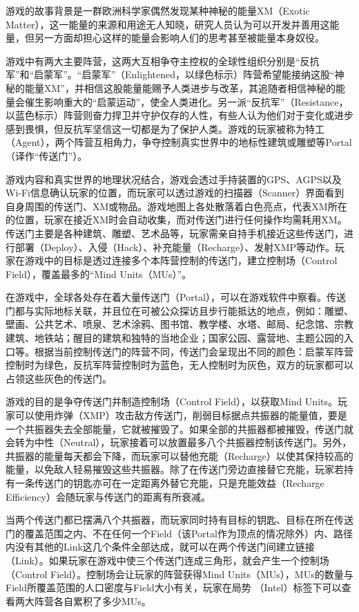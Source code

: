 \documentclass[UTF8]{ctexart}
\begin{document}
\begin{tcolorbox}[breakable]
    游戏的故事背景是一群欧洲科学家偶然发现某种神秘的能量XM（Exotic Matter），这一能量的来源和用途无人知晓，研究人员认为可以开发并善用这能量，但另一方面却担心这样的能量会影响人们的思考甚至被能量本身奴役。

    游戏中有两大主要阵营，这两大互相争夺主控权的全球性组织分别是“反抗军”和“启蒙军”。“启蒙军”（Enlightened，以绿色标示）阵营希望能接纳这股“神秘的能量XM”，并相信这股能量能赐予人类进步与改革，其追随者相信神秘的能量会催生影响重大的“启蒙运动”，使全人类进化。另一派“反抗军”（Resistance，以蓝色标示）阵营则奋力捍卫并守护仅存的人性，有些人认为他们对于变化或进步感到畏惧，但反抗军坚信这一切都是为了保护人类。游戏的玩家被称为特工（Agent），两个阵营互相角力，争夺控制真实世界中的地标性建筑或雕塑等Portal（译作“传送门”）。

    游戏内容和真实世界的地理状况结合，游戏会透过手持装置的GPS、AGPS以及Wi-Fi信息确认玩家的位置，而玩家可以透过游戏的扫描器（Scanner）界面看到自身周围的传送门、XM或物品。游戏地图上各处散落着白色亮点，代表XM所在的位置，玩家在接近XM时会自动收集，而对传送门进行任何操作均需耗用XM。传送门主要是各种建筑、雕塑、艺术品等，玩家需亲自持手机接近这些传送门，进行部署（Deploy）、入侵（Hack）、补充能量（Recharge）、发射XMP等动作。玩家在游戏中的目标是透过连接多个本阵营控制的传送门，建立控制场（Control Field），覆盖最多的“Mind Units（MUs）”。

    在游戏中，全球各处存在着大量传送门（Portal），可以在游戏软件中察看。传送门都与实际地标关联，并且位在可被公众探访且步行能抵达的地点，例如：雕塑、壁画、公共艺术、喷泉、艺术涂鸦、图书馆、教学楼、水塔、邮局、纪念馆、宗教建筑、地铁站；醒目的建筑和独特的当地企业；国家公园、露营地、主题公园的入口等。根据当前控制传送门的阵营不同，传送门会呈现出不同的颜色：启蒙军阵营控制时为绿色，反抗军阵营控制时为蓝色，无人控制时为灰色，双方的玩家都可以占领这些灰色的传送门。

    游戏的目的是争夺传送门并制造控制场（Control Field），以获取Mind Units。玩家可以使用炸弹（XMP）攻击敌方传送门，削弱目标据点共振器的能量值，要是一个共振器失去全部能量，它就被摧毁了。如果全部的共振器都被摧毁，传送门就会转为中性（Neutral），玩家接着可以放置最多八个共振器控制该传送门。另外，共振器的能量每天都会下降，而玩家可以替他充能（Recharge）以使其保持较高的能量，以免敌人轻易摧毁这些共振器。除了在传送门旁边直接替它充能，玩家若持有一条传送门的钥匙亦可在一定距离外替它充能，只是充能效益（Recharge Efficiency）会随玩家与传送门的距离有所衰减。

    当两个传送门都已摆满八个共振器，而玩家同时持有目标的钥匙、目标在所在传送门的覆盖范围之内、不在任何一个Field（该Portal作为顶点的情况除外）内、路径内没有其他的Link这几个条件全部达成，就可以在两个传送门间建立链接（Link）。如果玩家在游戏中使三个传送门连成三角形，就会产生一个控制场（Control Field）。控制场会让玩家的阵营获得Mind Units（MUs），MUs的数量与Field所覆盖范围的人口密度与Field大小有关，玩家在局势 （Intel）标签下可以查看两大阵营各自累积了多少MUs。


\end{tcolorbox}
\end{document}
